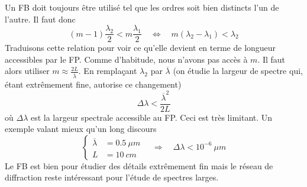 Un FB doit toujours être utilisé tel que les ordres soit bien distincts l'un de l'autre. Il faut donc
\begin{equation}
(m-1)\frac{\lambda_2}{2}<m\frac{\lambda_1}{2}\quad\Leftrightarrow\quad m(\lambda_2-\lambda_1)<\lambda_2
\end{equation}
Traduisons cette relation pour voir ce qu'elle devient en terme de longueur accessibles par le FP. 
Comme d'habitude, nous n'avons pas accès à $m$. Il faut alors  utiliser $m\approx \frac{2L}{\overline{
\lambda}}$. En remplaçant $\lambda_2$ par $\overline{\lambda}$ (on étudie la largeur de spectre qui, 
étant extrêmement fine, autorise ce changement)
\begin{equation}
\Delta \lambda <\dfrac{\overline{\lambda}^2}{2L}
\end{equation}
où $\Delta \lambda$ est la largeur spectrale accessible au FP. Ceci est très limitant. Un exemple 
valant mieux qu'un long discours
\begin{equation}
\left\{\begin{array}{ll}
\overline{\lambda} &= 0.5\ \mu m\\
L &= 10\ cm
\end{array}\right.\quad\Rightarrow\quad \Delta \lambda < 10^{-6}\ \mu m 
\end{equation}
Le FB est bien pour étudier des détails extrêmement fin mais le réseau de diffraction reste 
intéressant pour l'étude de spectres larges. 





























